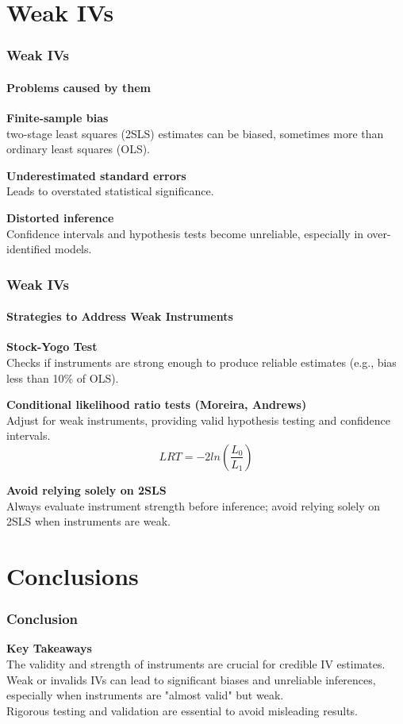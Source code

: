 \documentclass{beamer} %
\theoremstyle{definition}
\begin{document}
\section{Weak IVs}
\begin{frame}[fragile]
	\frametitle{Weak IVs}
	\framesubtitle{Problems caused by them}
	\textbf{Finite-sample bias}\\
	two-stage least squares (2SLS) estimates can be biased, sometimes more than ordinary least squares (OLS).
	
	\vspace{1em}
	\textbf{Underestimated standard errors}\\
	Leads to overstated statistical significance.
	
	\vspace{1em}
	\textbf{Distorted inference}\\
	Confidence intervals and hypothesis tests become unreliable, especially in over-identified models.
\end{frame}

\begin{frame}[fragile]
	\frametitle{Weak IVs}
	\framesubtitle{Strategies to Address Weak Instruments}
	\textbf{Stock-Yogo Test}\\
	Checks if instruments are strong enough to produce reliable estimates (e.g., bias less than 10\% of OLS).
	
	\vspace{1em}
	\textbf{Conditional likelihood ratio tests (Moreira, Andrews)}\\
	Adjust for weak instruments, providing valid hypothesis testing and confidence intervals.
	$$ LRT = -2 ln \left(\frac{L_0}{L_1}\right) $$
	
	\vspace{1em}
	\textbf{Avoid relying solely on 2SLS}\\
	Always evaluate instrument strength before inference; avoid relying solely on 2SLS when instruments are weak.
\end{frame}
\section{Conclusions}

\begin{frame}[fragile] 
	\frametitle{Conclusion} 
	\textbf{Key Takeaways} \\
	
	The validity and strength of instruments are crucial for credible IV estimates. Weak or invalids IVs can lead to significant biases and unreliable inferences, especially when instruments are "almost valid" but weak.\\
	\vspace{1em}	
	Rigorous testing and validation are essential to avoid misleading results. 
\end{frame}
\end{document}

